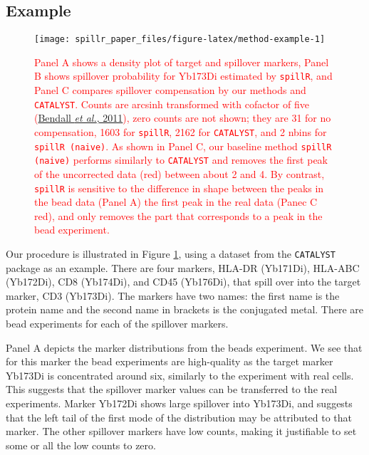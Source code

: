 \documentclass[
]{article}
\begin{document}
\subsection{Example}\label{example}

\begin{figure}

{\centering \texttt{[image: spillr\_paper\_files/figure-latex/method-example-1]} 

}

\caption{\textcolor{red}{Panel A shows a density plot of target and spillover markers, Panel B shows spillover probability for Yb173Di estimated by \texttt{spillR}, and Panel C compares spillover compensation by our methods and \texttt{CATALYST}. Counts are arcsinh transformed with cofactor of five (\protect\hyperlink{ref-bendall2011single}{Bendall \emph{et al.}, 2011}), zero counts are not shown; they are 31 for no compensation, 1603 for \texttt{spillR}, 2162 for \texttt{CATALYST}, and 2 nbins for \texttt{spillR (naive)}. As shown in Panel C, our baseline method \texttt{spillR (naive)} performs similarly to \texttt{CATALYST} and removes the first peak of the uncorrected data (red) between about 2 and 4. By contrast, \texttt{spillR} is sensitive to the difference in shape between the peaks in the bead data (Panel A) the first peak in the real data (Panec C red), and only removes the part that corresponds to a peak in the bead experiment.}}\label{fig:method-example}
\end{figure}

Our procedure is illustrated in Figure \ref{fig:method-example}, using a dataset from the \texttt{CATALYST} package as an example. There are four markers, HLA-DR (Yb171Di), HLA-ABC (Yb172Di), CD8 (Yb174Di), and CD45 (Yb176Di), that spill over into the target marker, CD3 (Yb173Di). The markers have two names: the first name is the protein name and the second name in brackets is the conjugated metal. There are bead experiments for each of the spillover markers.

Panel A depicts the marker distributions from the beads experiment. We see that for this marker the bead experiments are high-quality as the target marker Yb173Di is concentrated around six, similarly to the experiment with real cells. This suggests that the spillover marker values can be transferred to the real experiments. Marker Yb172Di shows large spillover into Yb173Di, and suggests that the left tail of the first mode of the distribution may be attributed to that marker. The other spillover markers have low counts, making it justifiable to set some or all the low counts to zero.
\end{document}
